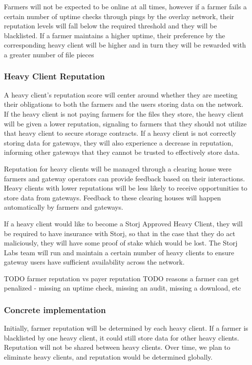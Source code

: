 \documentclass[a4paper,10pt]{article} \usepackage[utf8]{inputenc}
\newcommand{\todo}[1]{{\color{red} TODO #1}}
\begin{document}
Farmers will not be expected to be online at all times, however if a farmer fails a certain number of uptime checks through pings by the overlay network, their reputation levels will fall below the required threshold and they will be blacklisted. If a farmer maintains a higher uptime, their preference by the corresponding heavy client will be higher and in turn they will be rewarded with a greater number of file pieces 


\subsubsection{Heavy Client Reputation}
A heavy client’s reputation score will center around whether they are meeting their obligations to both the farmers and the users storing data on the network. If the heavy client is not paying farmers for the files they store, the heavy client will be given a lower reputation, signaling to farmers that they should not utilize that heavy client to secure storage contracts. If a heavy client is not correctly storing data for gateways, they will also experience a decrease in reputation, informing other gateways that they cannot be trusted to effectively store data. 

Reputation for heavy clients will be managed through a clearing house were farmers and gateway operators can provide feedback based on their interactions. Heavy clients with lower reputations will be less likely to receive opportunities to store data from gateways. Feedback to these clearing houses will happen automatically by farmers and gateways.

If a heavy client would like to become a Storj Approved Heavy Client, they will be required to have insurance with Storj, so that in the case that they do act maliciously, they will have some proof of stake which would be lost. The Storj Labs team will run and maintain a certain number of heavy clients to ensure gateway users have sufficient availability across the network.


\todo{farmer reputation vs payer reputation}
\todo{reasons a farmer can get penalized - missing an uptime check, missing an
      audit, missing a download, etc}

\subsubsection{Concrete implementation}
Initially, farmer reputation will be determined by each heavy client. If a farmer is blacklisted by one heavy client, it could still store data for other heavy clients. Reputation will not be shared between heavy clients. Over time, we plan to eliminate heavy clients, and reputation would be determined globally. 
\end{document}

